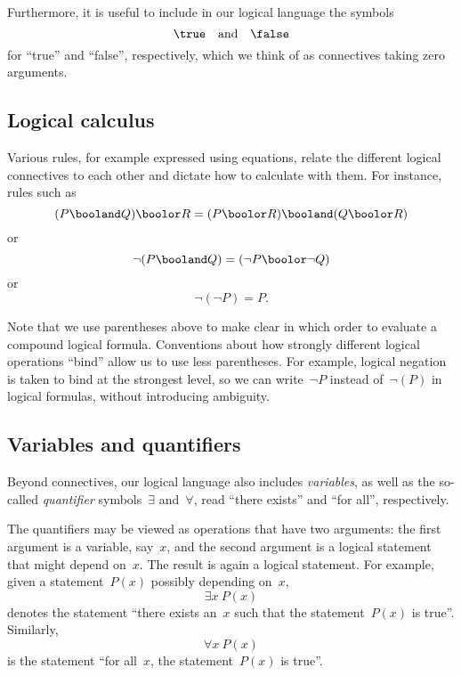 Furthermore, it is useful to include in our logical language the symbols
\begin{equation}
    \true \quad \text{and} \quad \false
\end{equation}
for ``true'' and ``false'', respectively, which we think of as connectives taking zero arguments.

\subsection{Logical calculus}

Various rules, for example expressed using equations, relate the different logical connectives to each other and dictate how to calculate with them.
For instance, rules such as
\begin{equation}
    (P \booland Q) \boolor R
    =
    (P \boolor R) \booland (Q \boolor R)
\end{equation}
or
\begin{equation}
    \lnot (P \booland Q) = (\lnot P \boolor \lnot Q)
\end{equation}
or
\begin{equation}
    \lnot (\lnot P) = P.
\end{equation}

Note that we use parentheses above to make clear in which order to evaluate a compound logical formula.
Conventions about how strongly different logical operations ``bind'' allow us to use less parentheses.
For example, logical negation is taken to bind at the strongest level, so we can write~$\lnot P$ instead of~$\lnot (P)$ in logical formulas, without introducing ambiguity.

\subsection{Variables and quantifiers}

Beyond connectives, our logical language also includes \emph{variables}, as well as the so-called \emph{quantifier} symbols~$\exists$ and~$\forall$, read ``there exists'' and ``for all'', respectively.

The quantifiers may be viewed as operations that have two arguments:
the first argument is a variable, say~$x$, and the second argument is a logical statement that might depend on~$x$.
The result is again a logical statement.
For example, given a statement~$P(x)$ possibly depending on~$x$,
\begin{equation}
    \exists x \ P(x)
\end{equation}
denotes the statement ``there exists an~$x$ such that the statement~$P(x)$ is true''.
Similarly,
\begin{equation}
    \forall x \ P(x)
\end{equation}
is the statement ``for all~$x$, the statement~$P(x)$ is true''.

